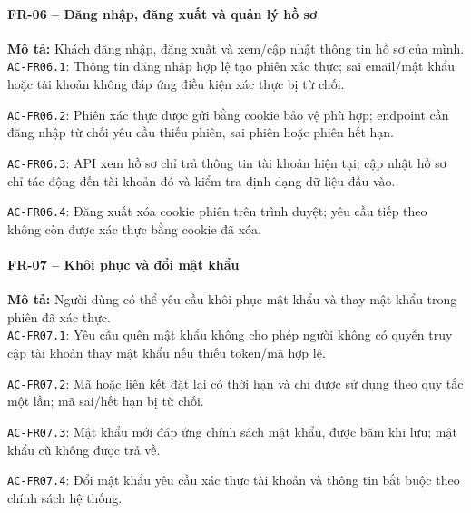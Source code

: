 \paragraph{FR-06 -- Đăng nhập, đăng xuất và quản lý hồ sơ}
\textbf{Mô tả:} Khách đăng nhập, đăng xuất và xem/cập nhật thông tin hồ sơ của mình.\\
\noindent\texttt{AC-FR06.1}: Thông tin đăng nhập hợp lệ tạo phiên xác thực; sai email/mật khẩu hoặc tài khoản không đáp ứng điều kiện xác thực bị từ chối.\par
\noindent\texttt{AC-FR06.2}: Phiên xác thực được gửi bằng cookie bảo vệ phù hợp; endpoint cần đăng nhập từ chối yêu cầu thiếu phiên, sai phiên hoặc phiên hết hạn.\par
\noindent\texttt{AC-FR06.3}: API xem hồ sơ chỉ trả thông tin tài khoản hiện tại; cập nhật hồ sơ chỉ tác động đến tài khoản đó và kiểm tra định dạng dữ liệu đầu vào.\par
\noindent\texttt{AC-FR06.4}: Đăng xuất xóa cookie phiên trên trình duyệt; yêu cầu tiếp theo không còn được xác thực bằng cookie đã xóa.\par

\paragraph{FR-07 -- Khôi phục và đổi mật khẩu}
\textbf{Mô tả:} Người dùng có thể yêu cầu khôi phục mật khẩu và thay mật khẩu trong phiên đã xác thực.\\
\noindent\texttt{AC-FR07.1}: Yêu cầu quên mật khẩu không cho phép người không có quyền truy cập tài khoản thay mật khẩu nếu thiếu token/mã hợp lệ.\par
\noindent\texttt{AC-FR07.2}: Mã hoặc liên kết đặt lại có thời hạn và chỉ được sử dụng theo quy tắc một lần; mã sai/hết hạn bị từ chối.\par
\noindent\texttt{AC-FR07.3}: Mật khẩu mới đáp ứng chính sách mật khẩu, được băm khi lưu; mật khẩu cũ không được trả về.\par
\noindent\texttt{AC-FR07.4}: Đổi mật khẩu yêu cầu xác thực tài khoản và thông tin bắt buộc theo chính sách hệ thống.\par

